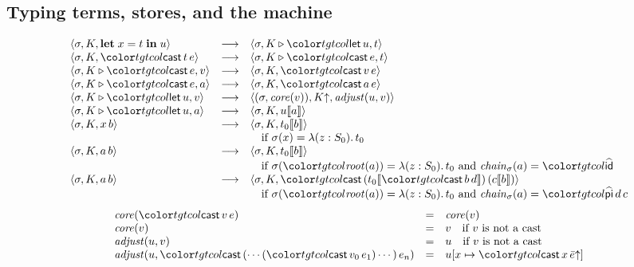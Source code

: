 \FloatBarrier
\subsection{Typing terms, stores, and the machine}\label{sec:mini-machine}

\begin{figure}[t]
\small
\color{tgtcol}
\[
\begin{array}{@{}lcl@{}}
\mst{\sigma}{K}{\klet x = t \kin u} &\step& \mst{\sigma}{K \triangleright \ev{let}\,u}{t} \\
\mst{\sigma}{K}{\ev{cast}\,t\,e} &\step& \mst{\sigma}{K \triangleright \ev{cast}\,e}{t} \\
\mst{\sigma}{K \triangleright \ev{cast}\,e}{v} &\step& \mst{\sigma}{K}{\ev{cast}\,v\,e} \\
\mst{\sigma}{K \triangleright \ev{cast}\,e}{a} &\step& \mst{\sigma}{K}{\ev{cast}\,a\,e} \\
\mst{\sigma}{K \triangleright \ev{let}\,u}{v} &\step& \mst{(\sigma, \mathit{core}(v))}{\weak{K}}{\mathit{adjust}(u, v)} \\
\mst{\sigma}{K \triangleright \ev{let}\,u}{a} &\step& \mst{\sigma}{K}{\inst{u}{a}} \\
\mst{\sigma}{K}{x\,b} &\step& \mst{\sigma}{K}{\inst{t_0}{b}} \\
& & \quad \text{if } \sigma(x) = \lambda(z : S_0).\,t_0 \\
\mst{\sigma}{K}{a\,b} &\step& \mst{\sigma}{K}{\inst{t_0}{b}} \\
& & \quad \text{if } \sigma(\rt{a}) = \lambda(z : S_0).\,t_0 \text{ and } \mathit{chain}_\sigma(a) = \form{id} \\
\mst{\sigma}{K}{a\,b} &\step& \mst{\sigma}{K}{\ev{cast}\,(\inst{t_0}{\ev{cast}\,b\,d})\,(\inst{c}{b})} \\
& & \quad \text{if } \sigma(\rt{a}) = \lambda(z : S_0).\,t_0 \text{ and } \mathit{chain}_\sigma(a) = \form{pi}\,d\,c
\end{array}
\]
\[
\begin{array}{@{}lcl@{}}
\mathit{core}(\ev{cast}\,v\,e) & = & \mathit{core}(v) \\
\mathit{core}(v) & = & v \quad \text{if } v \text{ is not a cast} \\
\mathit{adjust}(u, v) & = & u \quad \text{if } v \text{ is not a cast} \\
\mathit{adjust}(u, \ev{cast}\,(\cdots(\ev{cast}\,v_0\,e_1)\cdots)\,e_n) & = & u[x \mapsto \ev{cast}\,x\,\weak{\bar{e}}]
\end{array}
\]
\begin{mathpar}

\end{mathpar}
\end{figure}
